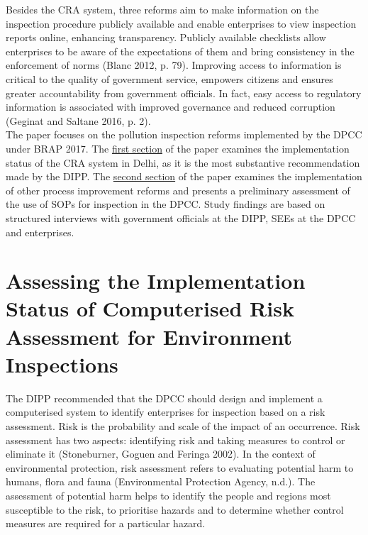 \documentclass[a4paper, 12pt]{article}
\begin{document}
                 Besides the CRA system, three reforms aim to make information on the inspection procedure publicly available and enable enterprises to view inspection reports online, enhancing transparency. Publicly available checklists allow enterprises to be aware of the expectations of them and bring consistency in the enforcement of norms (Blanc 2012, p. 79). Improving access to information is critical to the quality of government service, empowers citizens and ensures greater accountability from government officials. In fact, easy access to regulatory information is associated with improved governance and reduced corruption (Geginat and Saltane 2016, p. 2). \\
                 
                 The paper focuses on the pollution inspection reforms implemented by the DPCC under BRAP 2017. The \hyperref[sec:1]{first section} of the paper examines the implementation status of the CRA system in Delhi, as it is the most substantive recommendation made by the DIPP. The \hyperref[sec:2]{second section} of the paper examines the implementation of other process improvement reforms and presents a preliminary assessment of the use of SOPs for inspection in the DPCC. Study findings are based on structured interviews with government officials at the DIPP, SEEs at the DPCC and enterprises. \\ %
                 
                 \section{Assessing the Implementation Status of Computerised Risk Assessment for Environment Inspections}\label{sec:1} 
                 
                 The DIPP recommended that the DPCC should design and implement a computerised system to identify enterprises for inspection based on a risk assessment. Risk is the probability and scale of the impact of an occurrence. Risk assessment has two aspects: identifying risk and taking measures to control or eliminate it (Stoneburner, Goguen and Feringa 2002). In the context of environmental protection, risk assessment refers to evaluating potential harm to humans, flora and fauna (Environmental Protection Agency, n.d.). The assessment of potential harm helps to identify the people and regions most susceptible to the risk, to prioritise hazards and to determine whether control measures are required for a particular hazard. \\
                 
\end{document}
